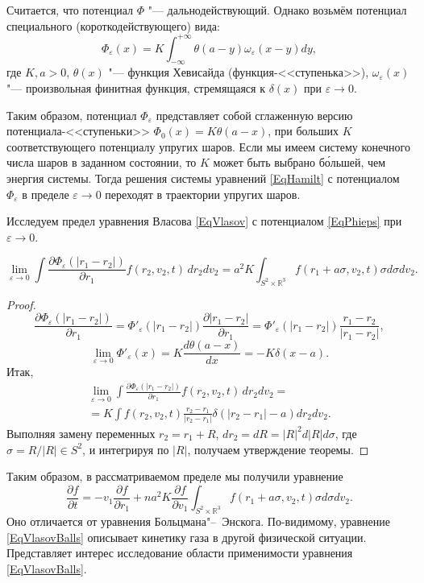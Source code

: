 Считается, что потенциал $\Phi$ "--- дальнодействующий. 
Однако возьмём потенциал специального (короткодействующего) вида:
\begin{equation}\label{EqPhieps}
\Phi_\varepsilon(x)=K\int_{-\infty}^{+\infty}\theta(a-y)\omega_\varepsilon(x-y)dy,\end{equation}
где $K,a>0$, $\theta(x)$ "--- функция Хевисайда (функция-<<ступенька>>), $\omega_\varepsilon(x)$ "--- произвольная финитная функция, стремящаяся к $\delta(x)$ при $\varepsilon\to0$.

Таким образом, потенциал $\Phi_\varepsilon$ представляет собой сглаженную версию потенциала-<<ступеньки>> $\Phi_0(x)=K\theta(a-x)$, при больших $K$ соответствующего потенциалу упругих шаров. Если мы имеем систему конечного числа шаров в заданном состоянии, то $K$ может быть выбрано б\'ольшей, чем энергия системы. Тогда решения системы уравнений \eqref{EqHamilt} с потенциалом $\Phi_\varepsilon$ в пределе $\varepsilon\to0$ переходят в траектории упругих шаров.

Исследуем предел уравнения Власова \eqref{EqVlasov} с потенциалом \eqref{EqPhieps} при $\varepsilon\to0$.

\smallskip

\begin{theorem}
$$\lim_{\varepsilon\to0}\int\frac{\partial\Phi_\varepsilon(|r_1-r_2|)}{\partial r_1}f(r_2,v_2,t)\,dr_2dv_2=a^2K\int_{S^2\times\mathbb R^3}f(r_1+a\sigma,v_2,t)\sigma d\sigma dv_2.$$
\end{theorem}


\smallskip
\begin{proof}
$$\frac{\partial\Phi_\varepsilon(|r_1-r_2|)}{\partial r_1}=
\Phi'_\varepsilon(|r_1-r_2|)\frac{\partial|r_1-r_2|}{\partial r_1}=
\Phi'_\varepsilon(|r_1-r_2|)\frac{r_1-r_2}{|r_1-r_2|},$$
$$\lim_{\varepsilon\to0}\Phi'_\varepsilon(x)=K\frac{d\theta(a-x)}{dx}=-K\delta(x-a).$$
Итак,
\begin{multline*}
\lim_{\varepsilon\to0}\int\frac{\partial\Phi_\varepsilon(|r_1-r_2|)}{\partial r_1}f(r_2,v_2,t)\,dr_2dv_2=\\=K\int f(r_2,v_2,t)\frac{r_2-r_1}{|r_2-r_1|}\delta(|r_2-r_1|-a)dr_2 dv_2.\end{multline*}
Выполняя замену переменных $r_2=r_1+R$, $dr_2=dR=|R|^2d|R|d\sigma$, где $\sigma={R}/{|R|}\in S^2$, и интегрируя по $|R|$, получаем утверждение теоремы.
 \end{proof}

\smallskip

Таким образом, в рассматриваемом пределе мы получили уравнение
\begin{equation}\label{EqVlasovBalls}
\frac{\partial f}{\partial t}=-v_1\frac{\partial f}{\partial r_1}+na^2K\frac{\partial f}{\partial v_1}\int_{S^2\times\mathbb R^3}f(r_1+a\sigma,v_2,t)\sigma d\sigma dv_2.
\end{equation}
Оно отличается от уравнения Больцмана"--~Энскога. По-видимому, уравнение \eqref{EqVlasovBalls} описывает кинетику газа в другой физической ситуации. Представляет интерес исследование области применимости уравнения \eqref{EqVlasovBalls}.

